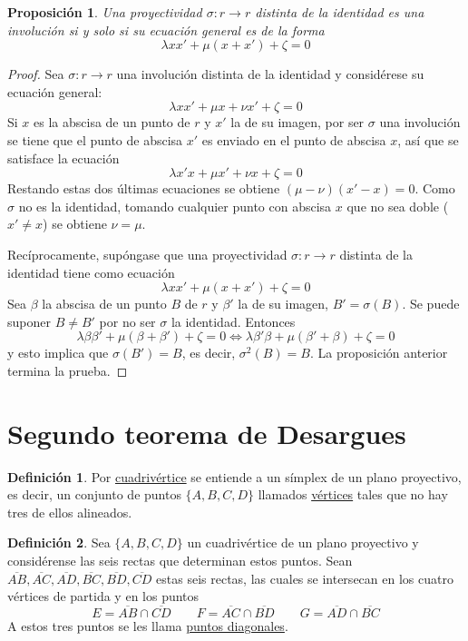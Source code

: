 \documentclass[12pt]{report}
\newtheorem{proposition}{Proposición}[chapter]
\theoremstyle{definition}
\newtheorem{definition}{Definición}[chapter]
\theoremstyle{definition}
\theoremstyle{remark}
\begin{document}
\begin{proposition}
Una proyectividad $\sigma \colon r \to r$ distinta de la identidad es una involución si y solo si su ecuación general es de la forma
\[\lambda x x' + \mu(x+x')+\zeta = 0\]
\end{proposition}

\begin{proof}
Sea $\sigma \colon r \to r$ una involución distinta de la identidad y considérese su ecuación general:
\[\lambda x x'+\mu x + \nu x' + \zeta = 0\]
Si $x$ es la abscisa de un punto de $r$ y $x'$ la de su imagen, por ser $\sigma$ una involución se tiene que el punto de abscisa $x'$ es enviado en el punto de abscisa $x$, así que se satisface la ecuación
\[\lambda x' x+\mu x' + \nu x + \zeta = 0\]
Restando estas dos últimas ecuaciones se obtiene $(\mu - \nu)(x' - x) = 0$. Como $\sigma$ no es la identidad, tomando cualquier punto con abscisa $x$ que no sea doble ($x' \neq x$) se obtiene $\nu = \mu$.

\vspace{2mm}
Recíprocamente, supóngase que una proyectividad $\sigma \colon r \to r$ distinta de la identidad tiene como ecuación
\[\lambda x x' + \mu(x+x')+\zeta = 0\]
Sea $\beta$ la abscisa de un punto $B$ de $r$ y $\beta'$ la de su imagen, $B' = \sigma(B)$. Se puede suponer $B \neq B'$ por no ser $\sigma$ la identidad. Entonces
\[\lambda \beta \beta' + \mu(\beta+\beta')+\zeta = 0 \iff \lambda \beta' \beta + \mu(\beta' + \beta) + \zeta = 0\]
y esto implica que $\sigma(B') = B$, es decir, $\sigma^2(B) = B$. La proposición anterior termina la prueba.
\end{proof}

\section{Segundo teorema de Desargues}

\begin{definition}
Por \ul{cuadrivértice} se entiende a un símplex de un plano proyectivo, es decir, un conjunto de puntos $\{A,B,C,D\}$ llamados \ul{vértices} tales que no hay tres de ellos alineados.
\end{definition}

\begin{definition}
Sea $\{A,B,C,D\}$ un cuadrivértice de un plano proyectivo y considérense las seis rectas que determinan estos puntos. Sean $\overline{AB}, \overline{AC}, \overline{AD}, \overline{BC}, \overline{BD}, \overline{CD}$ estas seis rectas, las cuales se intersecan en los cuatro vértices de partida y en los puntos
\[E = \overline{AB} \cap \overline{CD}  \qquad F = \overline{AC} \cap \overline{BD} \qquad G = \overline{AD} \cap \overline{BC} \]
A estos tres puntos se les llama \ul{puntos diagonales}.
\end{definition}
\end{document}
